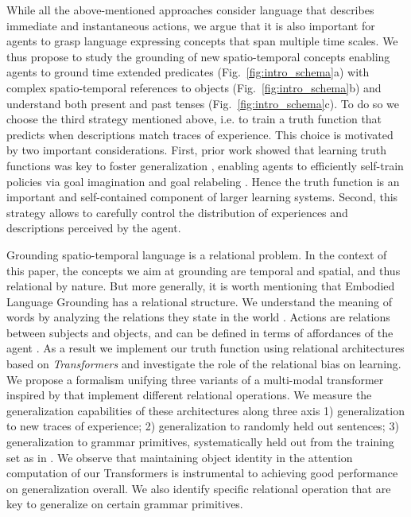 While all the above-mentioned approaches consider language that describes immediate and instantaneous actions, we argue that it is also important for agents to grasp language expressing concepts that span multiple time scales. We thus propose to study the grounding of new spatio-temporal concepts enabling agents to ground time extended predicates (Fig.~\ref{fig:intro_schema}a) with complex spatio-temporal references to objects (Fig.~\ref{fig:intro_schema}b) and understand both present and past tenses (Fig.~\ref{fig:intro_schema}c). To do so we choose the third strategy mentioned above, i.e. to train a truth function that predicts when descriptions match traces of experience. This choice is motivated by two important considerations. First, prior work showed that learning truth functions was key to foster generalization \cite{bahdanau2019learning}, enabling agents to efficiently self-train policies via goal imagination \cite{colas2020language} and goal relabeling \cite{cideron2020higher}. Hence the truth function is an important and self-contained component of larger learning systems. Second, this strategy allows to carefully control the distribution of experiences and descriptions perceived by the agent. 

Grounding spatio-temporal language is a relational problem. In the context of this paper, the concepts we aim at grounding are temporal and spatial, and thus relational by nature. But more generally, it is worth mentioning that Embodied Language Grounding has a relational structure. We understand the meaning of words by analyzing the relations they state in the world \cite{gentner2002relational}. Actions are relations between subjects and objects, and can be defined in terms of affordances of the agent \cite{GibsonJamesJ.JamesJerome1968Tsca}. As a result we implement our truth function using relational architectures based on \textit{Transformers} \cite{vaswani2017attention} and investigate the role of the relational bias \cite{battaglia2018relational} on learning. We propose a formalism unifying three variants of a multi-modal transformer inspired by \citet{ding2020objectbased} that implement different relational operations. We measure the generalization capabilities of these architectures along three axis 1) generalization to new traces of experience; 2) generalization to randomly held out sentences; 3) generalization to grammar primitives, systematically held out from the training set as in \citet{ruis2020benchmark}. We observe that maintaining object identity in the attention computation of our Transformers is instrumental to achieving good performance on generalization overall. We also identify specific relational operation that are key to generalize on certain grammar primitives.

